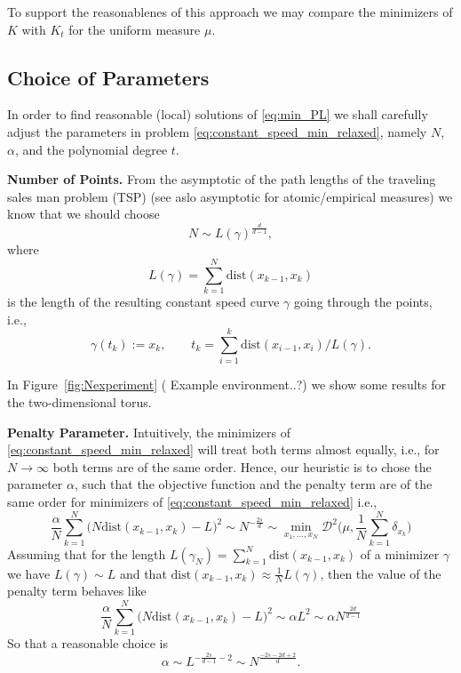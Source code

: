 \documentclass[%
a4paper,11pt,DIV=11,%
abstract=on%
]{scrartcl}
\begin{document}
{\color{blue} To support the reasonablenes of this approach we may compare the minimizers of $K$ with $K_{t}$ for the uniform measure $\mu$.}
\subsection{Choice of Parameters}

In order to find reasonable (local) solutions of \eqref{eq:min_PL} we shall carefully adjust the parameters in problem \eqref{eq:constant_speed_min_relaxed}, namely $N$, $\alpha$, and the polynomial degree $t$.

\textbf{Number of Points.}
From the asymptotic of the path lengths of the traveling sales man problem (TSP) {\color{blue}(see aslo asymptotic for atomic/empirical measures)}
we know that we should choose
\[
  N \sim L(\gamma)^{\frac{d}{d-1}},
\]
where
\[
  L(\gamma) = \sum_{k=1}^{N} \mathrm{dist}(x_{k-1},x_{k})
\]
is the length of the resulting constant speed curve $\gamma$ going through the points, i.e.,
\[
 \gamma(t_{k}) := x_{k}, \qquad t_{k} = \sum_{i=1}^{k}  \mathrm{dist}(x_{i-1},x_{i})/ L(\gamma).
\]

In Figure~\ref{fig:Nexperiment} {(\color{blue} Example environment..?)} we show some results for the two-dimensional torus. 

\textbf{Penalty Parameter.}
Intuitively, the minimizers of \eqref{eq:constant_speed_min_relaxed} will treat both terms almost equally, i.e., for $N\to \infty$ both terms are of the same order. Hence, our heuristic is to chose the parameter $\alpha$, such that the objective function and the penalty term are of the same order for minimizers of \eqref{eq:constant_speed_min_relaxed} i.e.,
\begin{equation}
  \label{eq:penalty_behavior}
  \frac{\alpha}{N} \sum_{k=1}^{N} \big(N \mathrm{dist}(x_{k-1},x_{k}) - L \big)^{2} \sim N^{-\frac{2s}{d}} \sim
  \min_{x_{1},\dots,x_{N}} \mathscr{D}^{2} \Big(\mu, \frac{1}{N} \sum_{k=1}^{N} \delta_{x_{k}}\Big) 
\end{equation}
Assuming that for the length $L(\gamma_{N}) = \sum_{k=1}^{N}\mathrm{dist}(x_{k-1},x_{k})$ of a minimizer $\gamma$ we have $L(\gamma) \sim L$ and that $\mathrm{dist}(x_{k-1},x_{k}) \approx \frac1N L(\gamma)$, then the value of the penalty term behaves like
\[
  \frac{\alpha}{N} \sum_{k=1}^{N} \big(N \mathrm{dist}(x_{k-1},x_{k}) - L \big)^{2} \sim  \alpha L^{2} \sim \alpha N^{\frac{2d}{d-1}}
\]
So that a reasonable choice is
\[
  \alpha \sim L^{-\frac{2s}{d-1}-2} \sim N^{\frac{-2s-2d+2}{d}}.
\]
\end{document}
